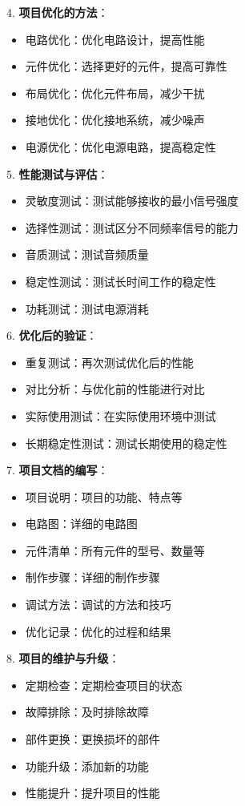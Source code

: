 \documentclass[12pt,UTF8]{ctexbook}
\begin{document}
4. \textbf{项目优化的方法}：
   \begin{itemize}[leftmargin=3.5em]
   \item 电路优化：优化电路设计，提高性能
   \item 元件优化：选择更好的元件，提高可靠性
   \item 布局优化：优化元件布局，减少干扰
   \item 接地优化：优化接地系统，减少噪声
   \item 电源优化：优化电源电路，提高稳定性
   \end{itemize}

5. \textbf{性能测试与评估}：
   \begin{itemize}[leftmargin=3.5em]
   \item 灵敏度测试：测试能够接收的最小信号强度
   \item 选择性测试：测试区分不同频率信号的能力
   \item 音质测试：测试音频质量
   \item 稳定性测试：测试长时间工作的稳定性
   \item 功耗测试：测试电源消耗
   \end{itemize}

6. \textbf{优化后的验证}：
   \begin{itemize}[leftmargin=3.5em]
   \item 重复测试：再次测试优化后的性能
   \item 对比分析：与优化前的性能进行对比
   \item 实际使用测试：在实际使用环境中测试
   \item 长期稳定性测试：测试长期使用的稳定性
   \end{itemize}

7. \textbf{项目文档的编写}：
   \begin{itemize}[leftmargin=3.5em]
   \item 项目说明：项目的功能、特点等
   \item 电路图：详细的电路图
   \item 元件清单：所有元件的型号、数量等
   \item 制作步骤：详细的制作步骤
   \item 调试方法：调试的方法和技巧
   \item 优化记录：优化的过程和结果
   \end{itemize}

8. \textbf{项目的维护与升级}：
   \begin{itemize}[leftmargin=3.5em]
   \item 定期检查：定期检查项目的状态
   \item 故障排除：及时排除故障
   \item 部件更换：更换损坏的部件
   \item 功能升级：添加新的功能
   \item 性能提升：提升项目的性能
   \end{itemize}
\end{document}
